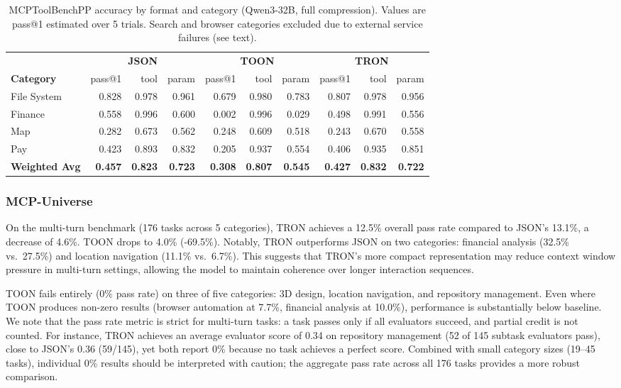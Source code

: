 \documentclass[11pt]{article}
\begin{document}
\begin{table}[t]
    \centering
    \footnotesize
    \caption{MCPToolBenchPP accuracy by format and category (Qwen3-32B, full compression). Values are pass@1 estimated over 5 trials. Search and browser categories excluded due to external service failures (see text).}
    \label{tab:benchpp_accuracy}
    \begin{tabular}{@{}l*{3}{rrr}@{}}
        \toprule
        & \multicolumn{3}{c}{\textbf{JSON}} & \multicolumn{3}{c}{\textbf{TOON}} & \multicolumn{3}{c}{\textbf{TRON}} \\
        \cmidrule(lr){2-4} \cmidrule(lr){5-7} \cmidrule(lr){8-10}
        \textbf{Category} & pass@1 & tool & param & pass@1 & tool & param & pass@1 & tool & param \\
        \midrule
        File System & 0.828 & 0.978 & 0.961 & 0.679 & 0.980 & 0.783 & 0.807 & 0.978 & 0.956 \\
        Finance & 0.558 & 0.996 & 0.600 & 0.002 & 0.996 & 0.029 & 0.498 & 0.991 & 0.556 \\
        Map & 0.282 & 0.673 & 0.562 & 0.248 & 0.609 & 0.518 & 0.243 & 0.670 & 0.558 \\
        Pay & 0.423 & 0.893 & 0.832 & 0.205 & 0.937 & 0.554 & 0.406 & 0.935 & 0.851 \\
        \midrule
        \textbf{Weighted Avg} & \textbf{0.457} & \textbf{0.823} & \textbf{0.723} & \textbf{0.308} & \textbf{0.807} & \textbf{0.545} & \textbf{0.427} & \textbf{0.832} & \textbf{0.722} \\
        \bottomrule
    \end{tabular}
\end{table}

\subsubsection{MCP-Universe}
On the multi-turn benchmark (176 tasks across 5 categories), TRON achieves a 12.5\% overall pass rate compared to JSON's 13.1\%, a decrease of 4.6\%. TOON drops to 4.0\% (-69.5\%). Notably, TRON outperforms JSON on two categories: financial analysis (32.5\% vs.\ 27.5\%) and location navigation (11.1\% vs.\ 6.7\%). This suggests that TRON's more compact representation may reduce context window pressure in multi-turn settings, allowing the model to maintain coherence over longer interaction sequences.

TOON fails entirely (0\% pass rate) on three of five categories: 3D design, location navigation, and repository management. Even where TOON produces non-zero results (browser automation at 7.7\%, financial analysis at 10.0\%), performance is substantially below baseline. We note that the pass rate metric is strict for multi-turn tasks: a task passes only if all evaluators succeed, and partial credit is not counted. For instance, TRON achieves an average evaluator score of 0.34 on repository management (52 of 145 subtask evaluators pass), close to JSON's 0.36 (59/145), yet both report 0\% because no task achieves a perfect score. Combined with small category sizes (19--45 tasks), individual 0\% results should be interpreted with caution; the aggregate pass rate across all 176 tasks provides a more robust comparison.
\end{document}

